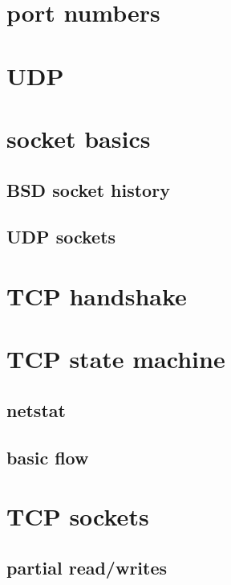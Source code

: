 \section{port numbers}


\section{UDP}


\section{socket basics}
\subsection{BSD socket history}


\subsection{UDP sockets}


\section{TCP handshake}


\section{TCP state machine}


\subsection{netstat}


\subsection{basic flow}


\section{TCP sockets}
\subsection{partial read/writes}



